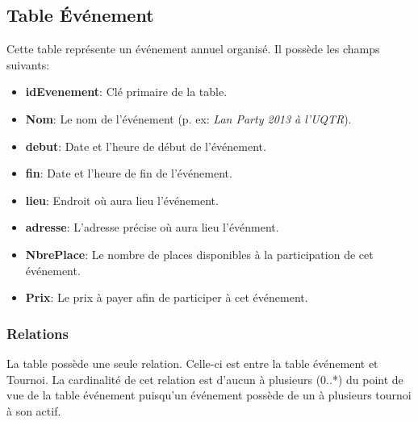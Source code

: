 \documentclass[11pt,french]{article}
\begin{document}
        \subsection{Table Événement} %
        \label{sub:table-enevement}
            Cette table représente un événement annuel organisé. Il possède les champs suivants:\\
            \begin{itemize}
                \item {\bf idEvenement}: Clé primaire de la table.
                \item {\bf Nom}: Le nom de l'événement (p. ex: \emph{Lan Party 2013 à l'UQTR}).
                \item {\bf debut}: Date et l'heure de début de l'événement.
                \item {\bf fin}: Date et l'heure de fin de l'événement.
                \item {\bf lieu}: Endroit où aura lieu l'événement.
                \item {\bf adresse}: L'adresse précise où aura lieu l'événment.
                \item {\bf NbrePlace}: Le nombre de places disponibles à la participation de cet événement.
                \item {\bf Prix}: Le prix à payer afin de participer à cet événement.
            \end{itemize}

            \subsubsection{Relations} %
            \label{ssub:relation-evenement}
                La table possède une seule relation. Celle-ci est entre la table événement et Tournoi. La cardinalité de cet relation
                est d'aucun à plusieurs (0..*) du point de vue de la table événement puisqu'un événement possède de un à plusieurs tournoi
                à son actif.
\end{document}
